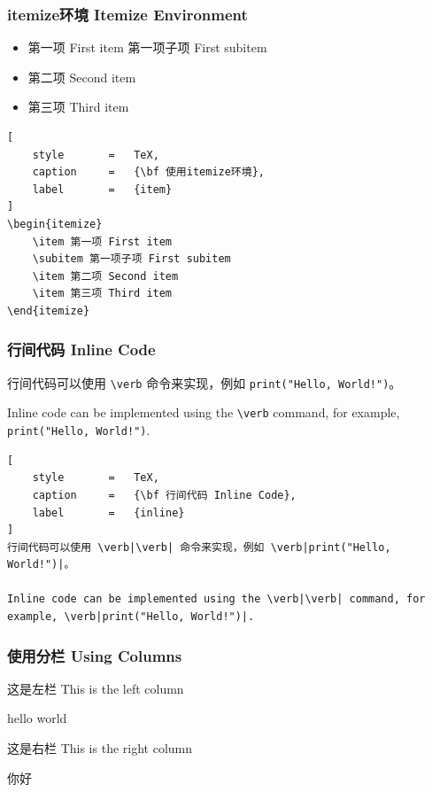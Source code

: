 \documentclass{article}
\begin{document}
\subsubsection{itemize环境 Itemize Environment}

\begin{itemize}
    \item 第一项 First item
    \subitem 第一项子项 First subitem   
    \item 第二项 Second item    
    \item 第三项 Third item
\end{itemize}

\clearpage

\begin{lstlisting}[
    style       =   TeX,
    caption     =   {\bf 使用itemize环境},
    label       =   {item}
]
\begin{itemize}
    \item 第一项 First item
    \subitem 第一项子项 First subitem   
    \item 第二项 Second item    
    \item 第三项 Third item
\end{itemize}
\end{lstlisting}

\subsubsection{行间代码 Inline Code}

行间代码可以使用 \verb|\verb| 命令来实现，例如 \verb|print("Hello, World!")|。

Inline code can be implemented using the \verb|\verb| command, for example, \verb|print("Hello, World!")|.

\begin{lstlisting}[
    style       =   TeX,
    caption     =   {\bf 行间代码 Inline Code},
    label       =   {inline}
]
行间代码可以使用 \verb|\verb| 命令来实现，例如 \verb|print("Hello, World!")|。

Inline code can be implemented using the \verb|\verb| command, for example, \verb|print("Hello, World!")|.

\end{lstlisting}

\subsubsection{使用分栏 Using Columns}

\begin{multicols}{2} %
    这是左栏 This is the left column

    hello world

    \columnbreak %

    这是右栏 This is the right column

    你好
\end{multicols}
\end{document}
